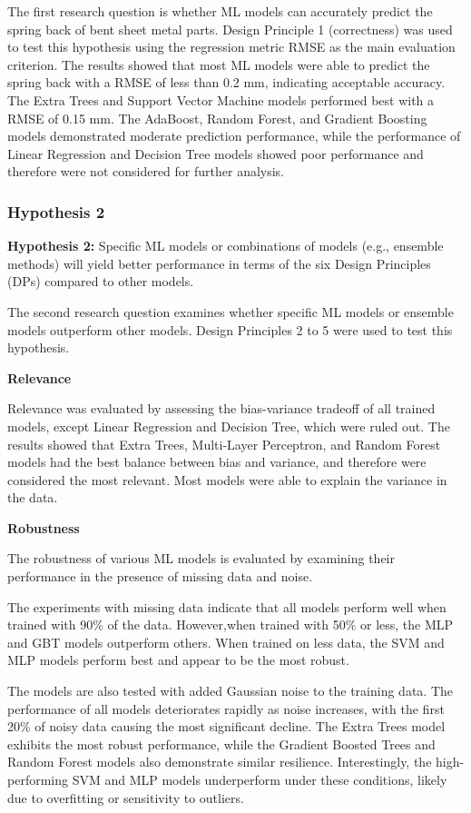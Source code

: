 The first research question is whether ML models can accurately predict the spring back of bent sheet metal parts.
Design Principle 1 (correctness) was used to test this hypothesis using the regression metric RMSE as the main
evaluation criterion.
The results showed that most ML models were able to predict the spring back with a RMSE of less
than 0.2 mm, indicating acceptable accuracy.
The Extra Trees and Support Vector Machine models performed best with a RMSE of 0.15 mm.
The AdaBoost, Random Forest, and Gradient Boosting models demonstrated moderate prediction
performance, while the performance of Linear Regression and Decision Tree models showed poor performance and
therefore were not considered for further analysis.

\subsubsection{Hypothesis 2}

\textbf{Hypothesis 2:} Specific ML models or combinations of models (e.g., ensemble methods) will yield better
performance
in terms of the six Design Principles (DPs) compared to other models.

The second research question examines whether specific ML models or ensemble models outperform other models.
Design Principles 2 to 5 were used to test this hypothesis.

\textbf{Relevance}

Relevance was evaluated by assessing the bias-variance tradeoff of all trained models, except Linear Regression and
Decision Tree, which were ruled out.
The results showed that Extra Trees, Multi-Layer Perceptron, and Random Forest models had the best balance between
bias and variance, and therefore were considered the most relevant.
Most models were able to explain the variance in the data.

\textbf{Robustness}

The robustness of various ML models is evaluated by examining their performance in the presence of
missing data and noise.

The experiments with missing data indicate that all models perform well when trained with 90\% of the data.
However,when trained with 50\% or less, the MLP and GBT models outperform others.
When trained on less data, the SVM and MLP models perform best and appear to be the most robust.

The models are also tested with added Gaussian noise to the training data.
The performance of all models deteriorates rapidly as noise increases, with the first 20\% of noisy data causing the
most significant decline.
The Extra Trees model exhibits the most robust performance, while the Gradient Boosted Trees and Random Forest models
also demonstrate similar resilience.
Interestingly, the high-performing SVM and MLP models underperform under these conditions, likely due to overfitting
or sensitivity to outliers.

